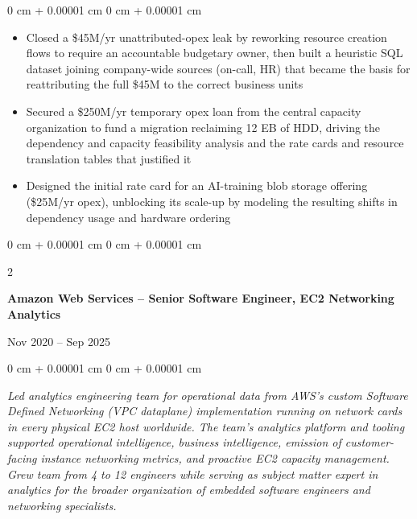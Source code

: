 \documentclass[10pt, letterpaper]{article}
\DeclareRobustCommand{\decorativeicon}[1]{%
    \BeginAccSupp{method=escape,ActualText={}}#1\EndAccSupp{}%
}
\newcommand{\companylogo}[1]{\decorativeicon{#1}\hspace{0.5em}}
\newenvironment{highlights}{
    \begin{itemize}[
        topsep=0.10 cm,
        parsep=0.10 cm,
        partopsep=0pt,
        itemsep=0pt,
        leftmargin=0 cm + 10pt
    ]
}{
    \end{itemize}
} %
\newenvironment{onecolentry}{
    \begin{adjustwidth}{
        0 cm + 0.00001 cm
    }{
        0 cm + 0.00001 cm
    }
}{
    \end{adjustwidth}
} %
\newenvironment{twocolentry}[2][]{
    \needspace{4\baselineskip} %
    \onecolentry
    \def\secondColumn{#2}
    \setcolumnwidth{\fill, 4.5 cm}
    \begin{paracol}{2}
}{
    \switchcolumn \raggedleft \secondColumn
    \end{paracol}
    \endonecolentry
} %
\begin{document}
        \vspace{0.05 cm}
        \begin{onecolentry}
            \begin{highlights}
                \item Closed a \$45M/yr unattributed-opex leak by reworking resource creation flows to require an accountable budgetary owner, then built a heuristic SQL dataset joining company-wide sources (on-call, HR) that became the basis for reattributing the full \$45M to the correct business units
                \item Secured a \$250M/yr temporary opex loan from the central capacity organization to fund a migration reclaiming 12 EB of HDD, driving the dependency and capacity feasibility analysis and the rate cards and resource translation tables that justified it
                \item Designed the initial rate card for an AI-training blob storage offering (\$25M/yr opex), unblocking its scale-up by modeling the resulting shifts in dependency usage and hardware ordering
            \end{highlights}
        \end{onecolentry}

        \vspace{0.2 cm}

        \begin{twocolentry}{
            Nov 2020 – Sep 2025
        }
            \textbf{\companylogo{\faAws}Amazon Web Services – Senior Software Engineer, EC2 Networking Analytics}
        \end{twocolentry}

        \vspace{0.05 cm}
        \begin{onecolentry}
            \textit{Led analytics engineering team for operational data from AWS's custom Software Defined Networking (VPC dataplane) implementation running on network cards in every physical EC2 host worldwide. The team's analytics platform and tooling supported operational intelligence, business intelligence, emission of customer-facing instance networking metrics, and proactive EC2 capacity management. Grew team from 4 to 12 engineers while serving as subject matter expert in analytics for the broader organization of embedded software engineers and networking specialists.}
        \end{onecolentry}
\end{document}
